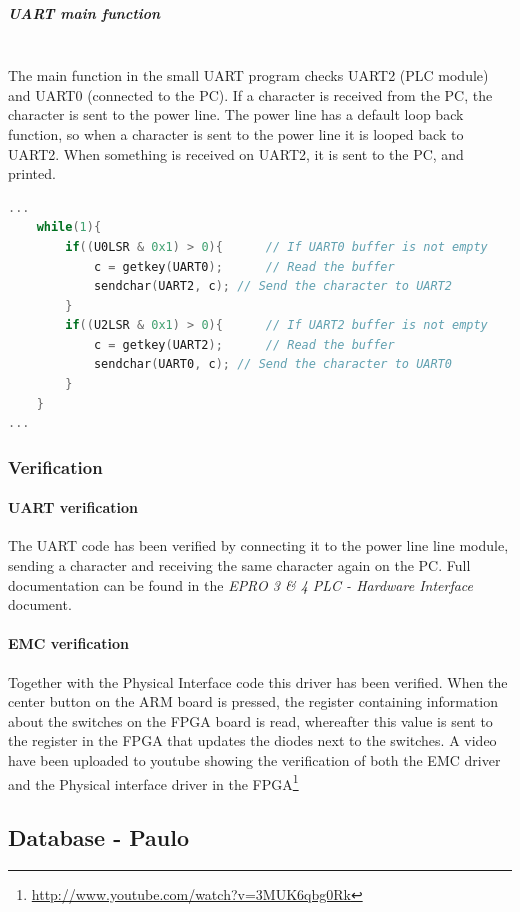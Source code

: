 \subparagraph{UART main function}\textbf{ }\\
The main function in the small UART program checks UART2 (PLC module) and UART0 (connected to the PC). If a character is received from the PC, the character is sent to the power line. The power line has a default loop back function, so when a character is sent to the power line it is looped back to UART2. When something is received on UART2, it is sent to the PC, and printed.
\begin{lstlisting}[language=c]
...
	while(1){
		if((U0LSR & 0x1) > 0){		// If UART0 buffer is not empty
			c = getkey(UART0);		// Read the buffer
			sendchar(UART2, c);	// Send the character to UART2
		}
		if((U2LSR & 0x1) > 0){		// If UART2 buffer is not empty
			c = getkey(UART2);		// Read the buffer
			sendchar(UART0, c);	// Send the character to UART0
		}
	}
...
\end{lstlisting}


\subsubsection{Verification}
\paragraph{UART verification}
The UART code has been verified by connecting it to the power line line module, sending a character and receiving the same character again on the PC. Full documentation can be found in the \textit{EPRO 3 \& 4 PLC - Hardware Interface} document.
\paragraph{EMC verification}
Together with the Physical Interface code this driver has been verified. When the center button on the ARM board is pressed, the register containing information about the switches on the FPGA board is read, whereafter this value is sent to the register in the FPGA that updates the diodes next to the switches. A video have been uploaded to youtube showing the verification of both the EMC driver and the Physical interface driver in the FPGA\footnote{\url{http://www.youtube.com/watch?v=3MUK6qbg0Rk}}
\subsection{Database - Paulo}

